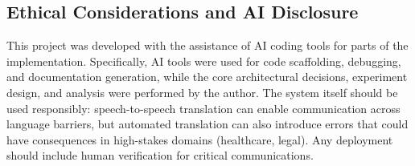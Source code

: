 \subsection{Ethical Considerations and AI Disclosure}

This project was developed with the assistance of AI coding tools for parts of the implementation. Specifically, AI tools were used for code scaffolding, debugging, and documentation generation, while the core architectural decisions, experiment design, and analysis were performed by the author. The system itself should be used responsibly: speech-to-speech translation can enable communication across language barriers, but automated translation can also introduce errors that could have consequences in high-stakes domains (healthcare, legal). Any deployment should include human verification for critical communications.
